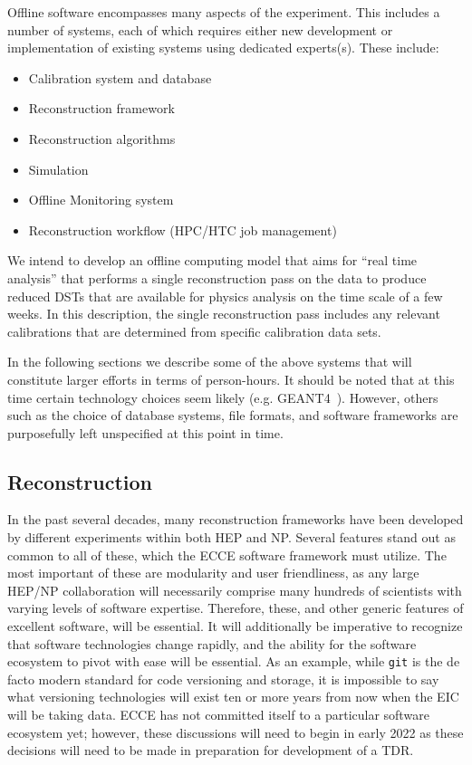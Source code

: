

Offline software encompasses many aspects of the experiment. This includes a number of systems, each of which requires either new development or implementation of existing systems using dedicated experts(s). These include:

\begin{itemize}
    \item Calibration system and database
    \item Reconstruction framework
    \item Reconstruction algorithms
    \item Simulation
    \item Offline Monitoring system
    \item Reconstruction workflow (HPC/HTC job management)
\end{itemize}

We intend to develop an offline computing model that aims for ``real time analysis'' that performs a single reconstruction pass on the data to produce reduced DSTs that are available for physics analysis on the time scale of a few weeks. In this description, the single reconstruction pass includes any relevant calibrations that are determined from specific calibration data sets. 

In the following sections we describe some of the above systems that will constitute larger efforts in terms of person-hours. It should be noted that at this time certain technology choices seem likely (e.g. GEANT4~\cite{ALLISON2016186}). However, others such as the choice of database systems, file formats, and software frameworks are purposefully left unspecified at this point in time.

\subsection{Reconstruction}\label{subsec:reconstruction}


In the past several decades, many reconstruction frameworks have been developed by different experiments within both HEP and NP. Several features stand out as common to all of these, which the ECCE software framework must utilize. The most important of these are modularity and user friendliness, as any large HEP/NP collaboration will necessarily comprise many hundreds of scientists with varying levels of software expertise. Therefore, these, and other generic features of excellent software, will be essential. It will additionally be imperative to recognize that software technologies change rapidly, and the ability for the software ecosystem to pivot with ease will be essential. As an example, while \texttt{git} is the de facto modern standard for code versioning and storage, it is impossible to say what versioning technologies will exist ten or more years from now when the EIC will be taking data. ECCE has not committed itself to a particular software ecosystem yet; however, these discussions will need to begin in early 2022 as these decisions will need to be made in preparation for development of a TDR.

